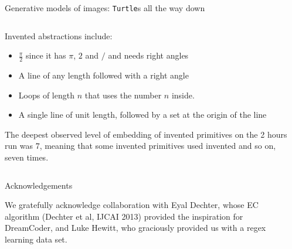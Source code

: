 \documentclass[final]{beamer}
\newlength{\onecolwid}
\newlength{\threecolwid}
\newcommand{\code}[1]{{\texttt{#1}}}
\newcommand{\pop}[1]{\textcolor{pop1}{#1}}
\newcommand{\popp}[1]{\textcolor{pop2}{#1}}
\begin{document}
\begin{frame}[t]
\begin{columns}[t]
\begin{column}{\threecolwid}
\begin{columns}[t,totalwidth=\threecolwid]
\begin{column}{\threecolwid}
\begin{block}{Generative models of images: \texttt{Turtle}s all the way down}
\begin{columns}[t,totalwidth=\threecolwid]
\begin{column}{\onecolwid}
  Invented abstractions include:
  \begin{itemize}
    \item $\frac\pi2$ since it has $\pi$, $2$ and $/$ and needs right angles
    \item A line of any length followed with a right angle
    \item Loops of length $n$ that uses the number $n$ inside.
    \item A single line of unit length, followed by a set at the origin of the
      line
  \end{itemize}

  The deepest observed level of embedding of invented primitives on the 2 hours
  run was $7$, meaning that some invented primitives used invented and so on,
  seven times.

\end{column}
\end{columns}

\end{block}


\begin{block}{Acknowledgements}

  We gratefully acknowledge collaboration with Eyal Dechter, whose EC algorithm (Dechter et al, IJCAI 2013) provided the inspiration for DreamCoder, and Luke Hewitt, who graciously provided us with
  a regex learning data set.

\end{block}





\end{column} %



\begin{column}{\onecolwid} %

\newcommand{\greenCode}[1]{{\footnotesize\popp{\code{#1}}}}
\newcommand{\blueCode}[1]{{\footnotesize\pop{\code{#1}}}}








\end{column}
\end{columns}
\end{column}
\end{columns}
\end{frame}
\end{document}
